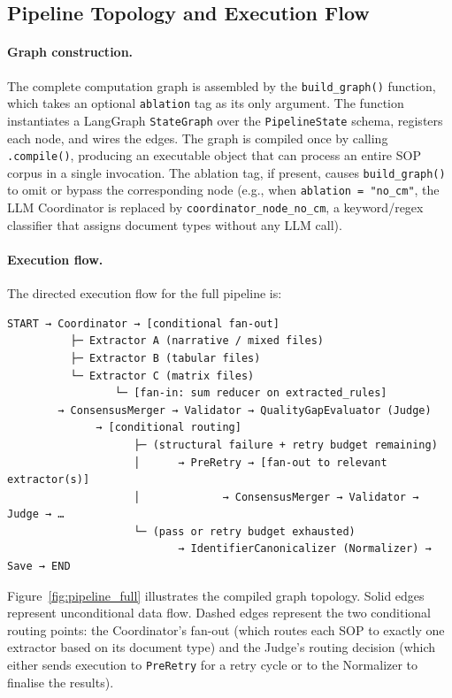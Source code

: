 ﻿\documentclass[11pt]{article}
\begin{document}
\subsection{Pipeline Topology and Execution Flow}
\label{sec:topology}

\paragraph{Graph construction.}
The complete computation graph is assembled by the \texttt{build\_graph()} function,
which takes an optional \texttt{ablation} tag as its only argument.  The function
instantiates a LangGraph \texttt{StateGraph} over the \texttt{PipelineState}
schema, registers each node, and wires the edges.  The graph is compiled once by
calling \texttt{.compile()}, producing an executable object that can process an
entire SOP corpus in a single invocation.  The ablation tag, if present, causes
\texttt{build\_graph()} to omit or bypass the corresponding node (e.g., when
\texttt{ablation = "no\_cm"}, the LLM Coordinator is replaced by
\texttt{coordinator\_node\_no\_cm}, a keyword/regex classifier that assigns
document types without any LLM call).

\paragraph{Execution flow.}
The directed execution flow for the full pipeline is:

\begin{verbatim}
START → Coordinator → [conditional fan-out]
          ├─ Extractor A (narrative / mixed files)
          ├─ Extractor B (tabular files)
          └─ Extractor C (matrix files)
                 └─ [fan-in: sum reducer on extracted_rules]
        → ConsensusMerger → Validator → QualityGapEvaluator (Judge)
              → [conditional routing]
                    ├─ (structural failure + retry budget remaining)
                    │      → PreRetry → [fan-out to relevant extractor(s)]
                    │             → ConsensusMerger → Validator → Judge → …
                    └─ (pass or retry budget exhausted)
                           → IdentifierCanonicalizer (Normalizer) → Save → END
\end{verbatim}

Figure~\ref{fig:pipeline_full} illustrates the compiled graph topology.  Solid
edges represent unconditional data flow.  Dashed edges represent the two
conditional routing points: the Coordinator's fan-out (which routes each SOP to
exactly one extractor based on its document type) and the Judge's routing decision
(which either sends execution to \texttt{PreRetry} for a retry cycle or to the
Normalizer to finalise the results).
\end{document}
